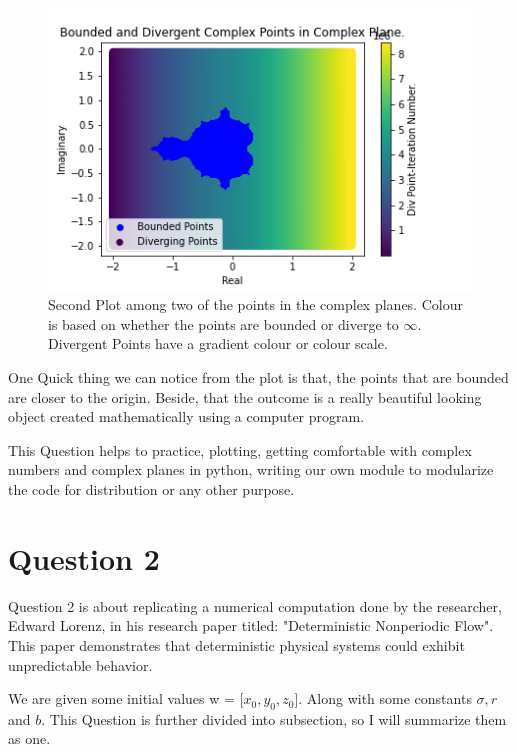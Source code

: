 \documentclass{article}
\begin{document}
\begin{figure}[!htb]
    \centering
    \includegraphics[scale=0.9]{q1_2.png}
    \caption{ Second Plot among two of the points in the complex planes. Colour is based on whether the points are bounded or diverge to $\infty$. Divergent Points have a gradient colour or colour scale. }
    \label{fig:q1_2.png}
\end{figure}
\newpage
One Quick thing we can notice from the plot is that, the points that are bounded are closer to the origin. Beside, that the outcome is a really beautiful looking object created mathematically using a computer program. 

This Question helps to practice, plotting, getting comfortable with complex numbers and complex planes in python, writing our own module to modularize the code for distribution or any other purpose.  

\section*{Question 2}

Question 2 is about replicating a numerical computation done by the researcher, Edward Lorenz, in his research paper titled: "Deterministic Nonperiodic Flow". This paper demonstrates that deterministic physical systems could exhibit unpredictable behavior. 

We are given some initial values w = [$x_0, y_0, z_0$]. Along with some constants $\sigma, r$ and $b$. 
This Question is further divided into subsection, so I will summarize them as one. \\\\
\end{document}
